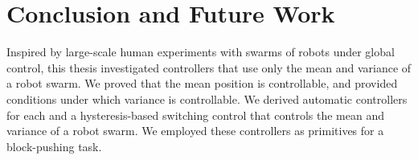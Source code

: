 \section{Conclusion and Future Work}\label{sec:conclusion}
    Inspired by large-scale human experiments with swarms of robots under global control,  this thesis investigated controllers that use only the mean and variance of a robot swarm. We proved that the mean position is controllable, and provided conditions under which variance is controllable.  We derived automatic controllers for each and a hysteresis-based switching control that controls the mean and variance of a robot swarm.  We employed these controllers as primitives for a block-pushing task. 
    

